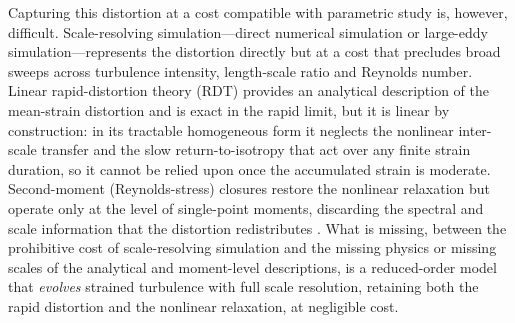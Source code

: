 \documentclass[lineno]{JFM-FLM_Au}
\begin{document}
Capturing this distortion at a cost compatible with parametric study is,
however, difficult. Scale-resolving simulation---direct numerical simulation
\citep{LeeReynolds1985} or large-eddy simulation---represents the
distortion directly but at a cost that precludes broad sweeps across turbulence
intensity, length-scale ratio and Reynolds number. Linear rapid-distortion
theory (RDT) provides an analytical description of the mean-strain distortion
\citep{HuntCarruthers1990,Sagaut2008} and is exact in the rapid limit, but it is
linear by construction: in its tractable homogeneous form it neglects the
nonlinear inter-scale transfer and the slow return-to-isotropy that act over any
finite strain duration, so it cannot be relied upon once the accumulated strain
is moderate. Second-moment (Reynolds-stress) closures restore the nonlinear
relaxation but operate only at the level of single-point moments, discarding the
spectral and scale information that the distortion redistributes
\citep{LaunderReeceRodi1975,Pope2000}. What is missing, between the prohibitive
cost of scale-resolving simulation and the missing physics or missing scales of
the analytical and moment-level descriptions, is a reduced-order model that
\emph{evolves} strained turbulence with full scale resolution, retaining both
the rapid distortion and the nonlinear relaxation, at negligible cost.
\end{document}
